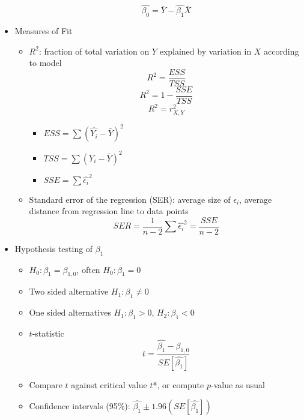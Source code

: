 \documentclass{article}
\begin{document}
\begin{itemize}
\begin{itemize}
\begin{equation*}
		\end{equation*}
		\begin{equation*}
\hat{\beta_0} = \bar{Y}-\hat{\beta_1}\bar{X}		\end{equation*}
		\end{itemize}
\clearpage 
	\item Measures of Fit
	\begin{itemize}
		\item $R^2$: fraction of total variation on $Y$ explained by variation in $X$ according to model
		\begin{equation*}
		R^2=\frac{ESS}{TSS}	
		\end{equation*}
		\begin{equation*}
		R^2=1-\frac{SSE}{TSS}	
		\end{equation*}
		\begin{equation*}
		R^2=r_{X,Y}^2	
		\end{equation*}
		\begin{itemize}
			\item $ESS = \sum (\hat{Y_i}-\bar{Y})^2$
			\item $TSS = \sum(Y_i-\bar{Y})^2$
			\item $SSE = \sum \hat{\epsilon_i}^2$ 
		\end{itemize}
		\item Standard error of the regression (SER): average size of $\epsilon_i$, average distance from regression line to data points
		\begin{equation*}
		SER=\frac{1}{n-2}\sum \hat{\epsilon_i}^2 = \frac{SSE}{n-2}
		\end{equation*}
	\end{itemize}
	\item Hypothesis testing of $\beta_1$
	\begin{itemize}
		\item $H_0: \beta_1=\beta_{1,0}$, often $H_0: \beta_1=0$
		\item Two sided alternative $H_1: \beta_1 \neq 0$
		\item One sided alternatives $H_1: \beta_1 > 0$, $H_2: \beta_1 < 0$
		\item $t$-statistic
		\begin{equation*}
t=\frac{\hat{\beta_1}-\beta_{1,0}}{SE[\hat{\beta_1}]}
		\end{equation*}
		\item Compare $t$ against critical value $t$*, or compute $p$-value as usual 
		\item Confidence intervals (95\%): $\hat{\beta_1} \pm 1.96(SE[\hat{\beta_1}])$

\end{itemize}
\end{itemize}
\end{document}

